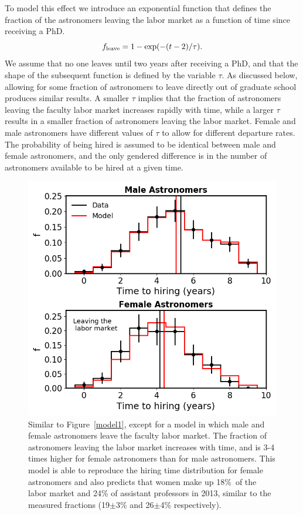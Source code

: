 \documentclass[modern]{aastex62}
\begin{document}
To model this effect we introduce an exponential function that defines the fraction of the astronomers leaving the labor market as a function of time since receiving a PhD.
\begin{equation}
f_{\rm leave} = 1-\exp (-(t-2)/\tau).
\end{equation}
We assume that no one leaves until two years after receiving a PhD, and that the shape of the subsequent function is defined by the variable $\tau$. As discussed below, allowing for some fraction of astronomers to leave directly out of graduate school produces similar results. A smaller $\tau$ implies that the fraction of astronomers leaving the faculty labor market increases rapidly with time, while a larger $\tau$ results in a smaller fraction of astronomers leaving the labor market. Female and male astronomers have different values of $\tau$ to allow for different departure rates. The probability of being hired is assumed to be identical between male and female astronomers, and the only gendered difference is in the number of astronomers available to be hired at a given time. 

\begin{figure}[!hbt]
\center
\includegraphics[scale=.6]{model3.png}
\caption{Similar to Figure~\ref{model1}, except for a model in which male and female astronomers leave the faculty labor market. The fraction of astronomers leaving the labor market increases with time, and is 3-4 times higher for female astronomers than for male astronomers. This model is able to reproduce the hiring time distribution for female astronomers and also predicts that women make up 18\%\ of the labor market and 24\% of assistant professors in 2013, similar to the measured fractions (19$\pm$3\% and 26$\pm$4\% respectively).  \label{model3}}
\end{figure}
\end{document}
